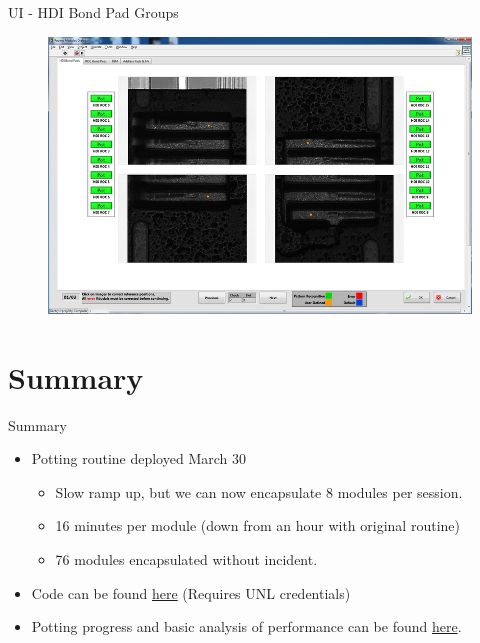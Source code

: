 \documentclass{beamer}
\begin{document}
\begin{frame}{UI - HDI Bond Pad Groups}
\begin{figure}
    \centering
    \includegraphics[width=\textwidth]{"figures/ui/review_HDI_pads"}
    \label{fig:review_hdi_pads}
\end{figure}
\end{frame}

\section{Summary}

\begin{frame}{Summary}
\begin{itemize}
    \item Potting routine deployed March 30
    \begin{itemize}
        \item Slow ramp up, but we can now encapsulate 8 modules per session.
        \item 16 minutes per module (down from an hour with original routine)
        \item 76 modules encapsulated without incident.
    \end{itemize}
    \item Code can be found \href{https://git.unl.edu/arts-and-sciences/gantry}{here} (Requires UNL credentials)
    \item Potting progress and basic analysis of performance can be found  
    \href{http://nbviewer.jupyter.org/github/cfangmeier/Small/blob/master/Potting\%20Data\%20Analysis/Potting\%20Data\%20Analysis.ipynb}{here}.
\end{itemize}
\end{frame}
\end{document}
